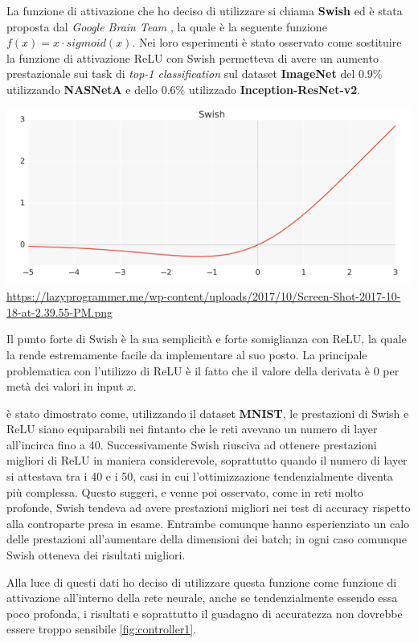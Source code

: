La funzione di attivazione che ho deciso di utilizzare si chiama \textbf{Swish} ed è stata proposta dal 
\emph{Google Brain Team} \cite{ramachandran2017searching}, la quale è la seguente funzione $f(x) = x \cdot sigmoid(x)$. 
Nei loro esperimenti è stato osservato come sostituire la funzione di attivazione ReLU con Swish permetteva 
di avere un aumento prestazionale sui task di \emph{top-1 classification} sul dataset \textbf{ImageNet} del $0.9\%$ utilizzando
\textbf{NASNetA} e dello $0.6\%$ utilizzado \textbf{Inception-ResNet-v2}. 

\begin{minipage}{\linewidth}
	\centering
	\includegraphics[width=\textwidth]{img/Screen-Shot-2017-10-18-at-2.39.55-PM.png}
	\url{https://lazyprogrammer.me/wp-content/uploads/2017/10/Screen-Shot-2017-10-18-at-2.39.55-PM.png}
	\label{fig:swish}
\end{minipage}

Il punto forte di Swish è la sua semplicità e forte somiglianza con ReLU, la quale la rende estremamente facile da implementare
al suo posto. La principale problematica con l'utilizzo di ReLU è il fatto che il valore della derivata è 0 per metà 
dei valori in input $x$. 

è stato dimostrato come, utilizzando il dataset \textbf{MNIST}, le prestazioni di Swish e ReLU siano 
equiparabili nei fintanto che le reti avevano un numero di layer all'incirca fino a 40. Successivamente Swish riusciva ad ottenere 
prestazioni migliori di ReLU in maniera considerevole, soprattutto quando il numero di layer si attestava tra i 40 e i 50, casi 
in cui l'ottimizzazione tendenzialmente diventa più complessa. Questo suggeri, e venne poi osservato, come 
in reti molto profonde, Swish tendeva ad avere prestazioni migliori nei test di accuracy rispetto alla controparte presa in esame. 
Entrambe comunque hanno esperienziato un calo delle prestazioni all'aumentare della dimensioni dei batch; in ogni caso comunque Swish otteneva 
dei risultati migliori. 

Alla luce di questi dati ho deciso di utilizzare questa funzione come funzione di attivazione all'interno della rete neurale, 
anche se tendenzialmente essendo essa poco profonda, i risultati e soprattutto il guadagno di accuratezza non dovrebbe essere troppo sensibile \ref{fig:controller1}.